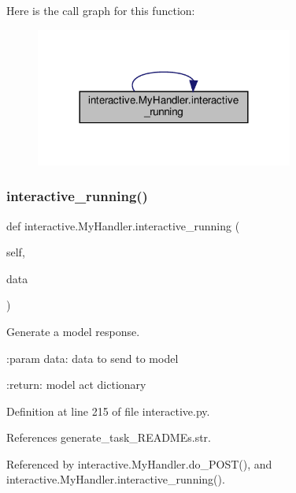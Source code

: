 Here is the call graph for this function\+:
\nopagebreak
\begin{figure}[H]
\begin{center}
\leavevmode
\includegraphics[width=240pt]{classinteractive_1_1MyHandler_ada828133485ee47cad9bfadf450fc49a_cgraph}
\end{center}
\end{figure}
\mbox{\label{classinteractive_1_1MyHandler_ada828133485ee47cad9bfadf450fc49a}} 
\subsubsection{\texorpdfstring{interactive\+\_\+running()}{interactive\_running()}\hspace{0.1cm}{\footnotesize\ttfamily [2/2]}}
{\footnotesize\ttfamily def interactive.\+My\+Handler.\+interactive\+\_\+running (\begin{DoxyParamCaption}\item[{}]{self,  }\item[{}]{data }\end{DoxyParamCaption})}

\begin{DoxyVerb}Generate a model response.

:param data:
    data to send to model

:return:
    model act dictionary
\end{DoxyVerb}
 

Definition at line 215 of file interactive.\+py.



References generate\+\_\+task\+\_\+\+R\+E\+A\+D\+M\+Es.\+str.



Referenced by interactive.\+My\+Handler.\+do\+\_\+\+P\+O\+S\+T(), and interactive.\+My\+Handler.\+interactive\+\_\+running().

